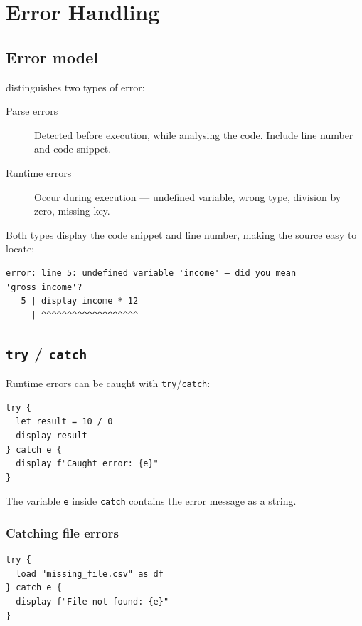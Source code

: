 \chapter{Error Handling}

\section{Error model}

\hayashi{} distinguishes two types of error:

\begin{description}
  \item[Parse errors] Detected before execution, while analysing the code.
        Include line number and code snippet.
  \item[Runtime errors] Occur during execution — undefined variable, wrong
        type, division by zero, missing key.
\end{description}

Both types display the code snippet and line number, making the source easy
to locate:

\begin{lstlisting}[style=inline]
error: line 5: undefined variable 'income' — did you mean 'gross_income'?
   5 | display income * 12
     | ^^^^^^^^^^^^^^^^^^^
\end{lstlisting}

\section{\texttt{try} / \texttt{catch}}

Runtime errors can be caught with \lstinline{try}/\lstinline{catch}:

\begin{lstlisting}[caption={Basic try/catch}]
try {
  let result = 10 / 0
  display result
} catch e {
  display f"Caught error: {e}"
}
\end{lstlisting}

The variable \lstinline{e} inside \lstinline{catch} contains the error
message as a string.

\subsection*{Catching file errors}

\begin{lstlisting}
try {
  load "missing_file.csv" as df
} catch e {
  display f"File not found: {e}"
}
\end{lstlisting}

